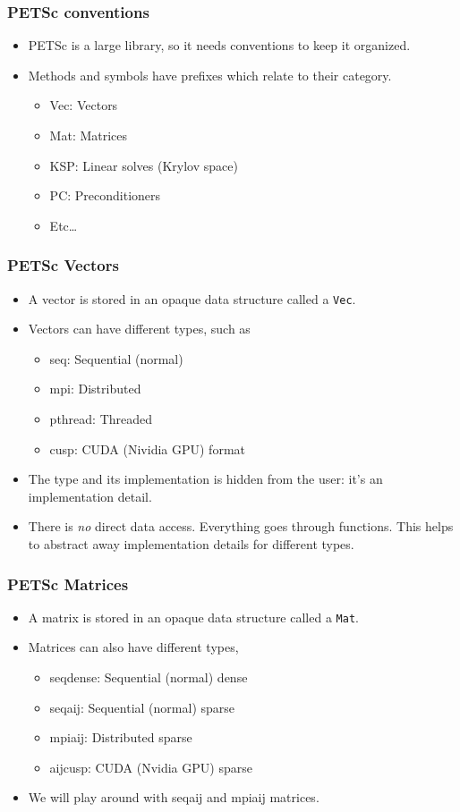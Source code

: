 \begin{frame}
  \frametitle{PETSc conventions}
  \begin{itemize}
  \item PETSc is a large library, so it needs conventions to keep it organized.
  \item Methods and symbols have prefixes which relate to their category.
    \begin{itemize}
    \item Vec: Vectors
    \item Mat: Matrices
    \item KSP: Linear solves (Krylov space)
    \item PC: Preconditioners
    \item Etc\ldots
    \end{itemize}
  \end{itemize}
\end{frame}

\begin{frame}
  \frametitle{PETSc Vectors}
  \begin{itemize}
  \item A vector is stored in an opaque data structure called a \texttt{Vec}.
  \item Vectors can have different types, such as
    \begin{itemize}
    \item seq: Sequential (normal)
    \item mpi: Distributed
    \item pthread: Threaded
    \item cusp: CUDA (Nividia GPU) format
    \end{itemize}
  \item The type and its implementation is hidden from the user: it's an
    implementation detail.
  \item There is \emph{no} direct data access. Everything goes through
    functions. This helps to abstract away implementation details for different
    types.
  \end{itemize}
\end{frame}

\begin{frame}
  \frametitle{PETSc Matrices}
  \begin{itemize}
  \item A matrix is stored in an opaque data structure called a \texttt{Mat}.
  \item Matrices can also have different types,
    \begin{itemize}
    \item seqdense: Sequential (normal) dense
    \item seqaij: Sequential (normal) sparse
    \item mpiaij: Distributed sparse
    \item aijcusp: CUDA (Nvidia GPU) sparse
    \end{itemize}
  \item We will play around with seqaij and mpiaij matrices.
  \end{itemize}
\end{frame}

